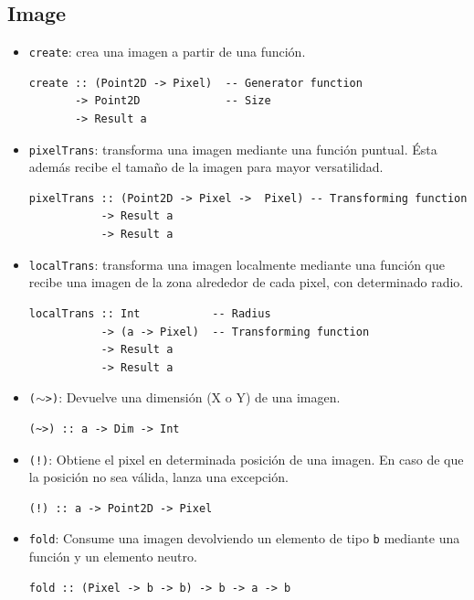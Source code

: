 \documentclass[a4paper, 11pt]{article} %
\begin{document}
\subsection*{Image}
	\begin{itemize} 
		\item \texttt{create}: crea una imagen a partir de una función.
\begin{lstlisting}
create :: (Point2D -> Pixel)  -- Generator function
       -> Point2D             -- Size
       -> Result a
\end{lstlisting}
		\item \texttt{pixelTrans}: transforma una imagen mediante una función puntual. Ésta además recibe el tamaño de la imagen para mayor versatilidad.
\begin{lstlisting}
pixelTrans :: (Point2D -> Pixel ->  Pixel) -- Transforming function
           -> Result a
           -> Result a
\end{lstlisting}
		\item \texttt{localTrans}: transforma una imagen localmente mediante una función que recibe una imagen de la zona alrededor de cada pixel, con determinado radio.
\begin{lstlisting}
localTrans :: Int           -- Radius
           -> (a -> Pixel)  -- Transforming function
           -> Result a
           -> Result a
\end{lstlisting}
		\item \texttt{($\sim$>)}: Devuelve una dimensión (X o Y) de una imagen.
\begin{lstlisting}
(~>) :: a -> Dim -> Int
\end{lstlisting}
		\item \texttt{(!)}: Obtiene el pixel en determinada posición de una imagen. En caso de que la posición no sea válida, lanza una excepción.
\begin{lstlisting}
(!) :: a -> Point2D -> Pixel
\end{lstlisting}
		\item \texttt{fold}: Consume una imagen devolviendo un elemento de tipo \texttt{b} mediante una función y un elemento neutro.
\begin{lstlisting}
fold :: (Pixel -> b -> b) -> b -> a -> b
\end{lstlisting}

	\end{itemize}

\end{document}
